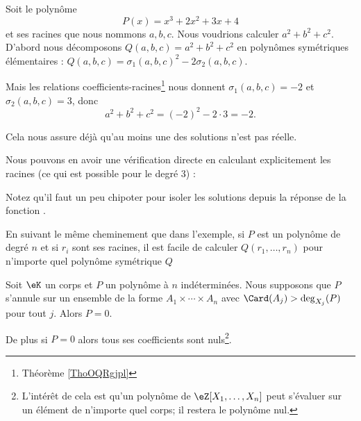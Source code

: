 
\begin{example} \label{ExHIfHhBr}
    Soit le polynôme
    \begin{equation}
        P(x)=x^3+2x^2+3x+4
    \end{equation}
    et ses racines que nous nommons \( a,b,c\). Nous voudrions calculer \( a^2+b^2+c^2\). D'abord nous décomposons \( Q(a,b,c)=a^2+b^2+c^2\) en polynômes symétriques élémentaires : \( Q(a,b,c)=\sigma_1(a,b,c)^2-2\sigma_2(a,b,c)\).

    Mais les relations coefficients-racines\footnote{Théorème \ref{ThoOQRgjpl}} nous donnent \( \sigma_1(a,b,c)=-2\) et \( \sigma_2(a,b,c)=3\), donc
    \begin{equation}
        a^2+b^2+c^2=(-2)^2-2\cdot 3=-2.
    \end{equation}

    Cela nous assure déjà qu'au moins une des solutions n'est pas réelle.

    Nous pouvons en avoir une vérification directe en calculant explicitement les racines (ce qui est possible pour le degré \( 3\)) :
    

    Notez qu'il faut un peu chipoter pour isoler les solutions depuis la réponse de la fonction .
\end{example}

En suivant le même cheminement que dans l'exemple, si \( P\) est un polynôme de degré \( n\) et si \( r_i\) sont ses racines, il est facile de calculer \( Q(r_1,\ldots, r_n)\) pour n'importe quel polynôme symétrique \( Q\)

\begin{proposition} \label{PropTETooGuBYQf}
    Soit \( \eK\) un corps et \( P\) un polynôme à \( n\) indéterminées. Nous supposons que \(P\) s'annule sur un ensemble de la forme \( A_1\times\cdots\times A_n\) avec \( \Card(A_j)>\deg_{X_j}(P)\) pour tout \( j\). Alors \( P=0\).

    De plus si \( P=0\) alors tous ses coefficients sont nuls\footnote{L'intérêt de cela est qu'un polynôme de \( \eZ[X_1,\ldots, X_n]\) peut s'évaluer sur un élément de n'importe quel corps; il restera le polynôme nul.}.
\end{proposition}

